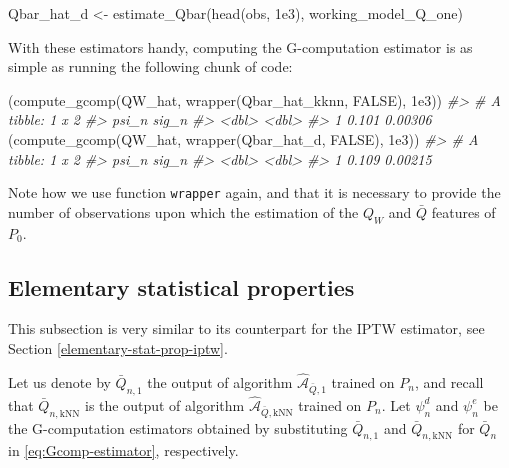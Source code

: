 \documentclass[
  11pt,
  openright,twoside]{book}
\newenvironment{Shaded}{\begin{snugshade}}{\end{snugshade}}
\newcommand{\CommentTok}[1]{\textcolor[rgb]{0.56,0.35,0.01}{\textit{#1}}}
\newcommand{\ConstantTok}[1]{\textcolor[rgb]{0.00,0.00,0.00}{#1}}
\newcommand{\FloatTok}[1]{\textcolor[rgb]{0.00,0.00,0.81}{#1}}
\newcommand{\FunctionTok}[1]{\textcolor[rgb]{0.00,0.00,0.00}{#1}}
\newcommand{\NormalTok}[1]{#1}
\newcommand{\OtherTok}[1]{\textcolor[rgb]{0.56,0.35,0.01}{#1}}
\newcommand{\Algo}{\widehat{\mathcal{A}}}
\newcommand{\Qbar}{\bar{Q}}
\theoremstyle{definition}
\theoremstyle{definition}
\theoremstyle{definition}
\theoremstyle{definition}
\theoremstyle{remark}
\begin{document}
\begin{Shaded}
\begin{Highlighting}[]
\NormalTok{Qbar\_hat\_d }\OtherTok{\textless{}{-}} \FunctionTok{estimate\_Qbar}\NormalTok{(}\FunctionTok{head}\NormalTok{(obs, }\FloatTok{1e3}\NormalTok{), working\_model\_Q\_one)}
\end{Highlighting}
\end{Shaded}

With these estimators handy, computing the G-computation estimator is as
simple as running the following chunk of code:

\begin{Shaded}
\begin{Highlighting}[]
\NormalTok{(}\FunctionTok{compute\_gcomp}\NormalTok{(QW\_hat, }\FunctionTok{wrapper}\NormalTok{(Qbar\_hat\_kknn, }\ConstantTok{FALSE}\NormalTok{), }\FloatTok{1e3}\NormalTok{))}
\CommentTok{\#\textgreater{} \# A tibble: 1 x 2}
\CommentTok{\#\textgreater{}   psi\_n   sig\_n}
\CommentTok{\#\textgreater{}   \textless{}dbl\textgreater{}   \textless{}dbl\textgreater{}}
\CommentTok{\#\textgreater{} 1 0.101 0.00306}
\NormalTok{(}\FunctionTok{compute\_gcomp}\NormalTok{(QW\_hat, }\FunctionTok{wrapper}\NormalTok{(Qbar\_hat\_d, }\ConstantTok{FALSE}\NormalTok{), }\FloatTok{1e3}\NormalTok{))}
\CommentTok{\#\textgreater{} \# A tibble: 1 x 2}
\CommentTok{\#\textgreater{}   psi\_n   sig\_n}
\CommentTok{\#\textgreater{}   \textless{}dbl\textgreater{}   \textless{}dbl\textgreater{}}
\CommentTok{\#\textgreater{} 1 0.109 0.00215}
\end{Highlighting}
\end{Shaded}

Note how we use function \texttt{wrapper} again, and that it is necessary to provide
the number of observations upon which the estimation of the \(Q_{W}\) and
\(\Qbar\) features of \(P_{0}\).

\hypertarget{elementary-statistical-properties-1}{%
\subsection{Elementary statistical properties}\label{elementary-statistical-properties-1}}

This subsection is very similar to its counterpart for the IPTW estimator, see
Section \ref{elementary-stat-prop-iptw}.

Let us denote by \(\Qbar_{n,1}\) the output of algorithm \(\Algo_{\Qbar,1}\)
trained on \(P_{n}\), and recall that \(\Qbar_{n,\text{kNN}}\) is the output of
algorithm \(\Algo_{\Qbar,\text{kNN}}\) trained on \(P_{n}\). Let \(\psi_{n}^{d}\)
and \(\psi_{n}^{e}\) be the G-computation estimators obtained by substituting
\(\Qbar_{n,1}\) and \(\Qbar_{n,\text{kNN}}\) for \(\Qbar_{n}\) in
\eqref{eq:Gcomp-estimator}, respectively.
\end{document}
